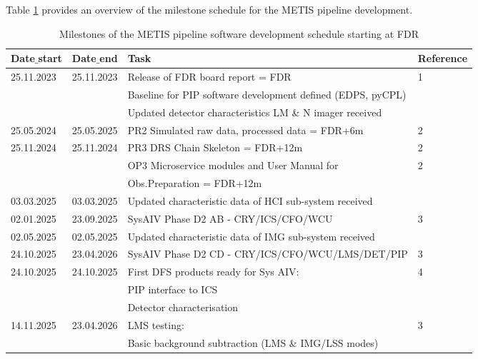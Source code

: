 Table \ref{tab:development_schedule} provides an overview of the milestone schedule for the METIS pipeline development.

\begin{table}
    \caption[Development schedule]{Milestones of the METIS pipeline software development schedule starting at FDR}
  \label{tab:development_schedule}

\centering
\scriptsize
\begin{tabularx}{\textwidth}{llll}

\hline
Date$\_$start &	Date$\_$end   &	Task                            &		Reference \\
\hline\hline
25.11.2023 & 25.11.2023 & Release of FDR board report = FDR        &	1 \\
	  &		   & Baseline for PIP software development defined (EDPS, pyCPL) &	\\
    &    	 & Updated detector characteristics LM \& N imager received    &	\\
\hline
25.05.2024 & 25.05.2025 & PR2 Simulated raw data, processed data = FDR+6m &	2 \\
\hline
25.11.2024 & 25.11.2024 & PR3 DRS Chain Skeleton = FDR+12m     &	2 \\
	&		 &	OP3 Microservice modules and User Manual for                &	2 \\
    &        &  Obs.Preparation = FDR+12m                                 &	\\
\hline
03.03.2025 & 03.03.2025 & Updated characteristic data of HCI sub-system received & \\
\hline
02.01.2025 & 23.09.2025 & SysAIV Phase D2 AB - CRY/ICS/CFO/WCU          &	3 \\
\hline
02.05.2025 & 02.05.2025 & Updated characteristic data of IMG sub-system received & \\
\hline
24.10.2025 & 23.04.2026 & SysAIV Phase D2 CD - CRY/ICS/CFO/WCU/LMS/DET/PIP            &	3 \\
\hline
24.10.2025 & 24.10.2025 & First DFS products ready for Sys AIV:            &	4 \\
    &          &  PIP interface to ICS                                        &	\\
    &          &  Detector characterisation                                   &	\\
\hline
14.11.2025 & 23.04.2026 & LMS testing:                                      &	3 \\ 
    &          & Basic background subtraction (LMS \& IMG/LSS modes)          &	\\

\end{tabularx}
\end{table}
